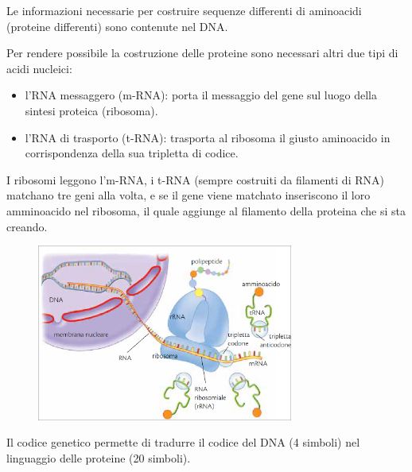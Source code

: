 \documentclass[a4paper]{article}
\begin{document}
Le informazioni necessarie per costruire sequenze
differenti di aminoacidi (proteine differenti) sono
contenute nel DNA.

Per rendere possibile la costruzione delle proteine sono
necessari altri due tipi di acidi nucleici:

\begin{itemize}
    \item l'RNA messaggero (m-RNA): porta il messaggio del
        gene sul luogo della sintesi proteica (ribosoma).
    \item l'RNA di trasporto (t-RNA): trasporta al ribosoma il
        giusto aminoacido in corrispondenza della sua
        tripletta di codice.
\end{itemize}

I ribosomi leggono l'm-RNA, i t-RNA (sempre costruiti da filamenti di RNA)
matchano tre geni alla volta, e se il gene
viene matchato inseriscono il loro amminoacido nel ribosoma, il quale
aggiunge al filamento della proteina che si sta creando.

\vspace{.25cm}

\begin{center}
\begin{figure}[th]
    \centering
    \includegraphics[width=0.75\textwidth]{./protein_synthesis.png}
\end{figure}
\end{center}


Il codice genetico permette di tradurre il codice del DNA
(4 simboli) nel linguaggio delle proteine (20 simboli).

\end{document}
